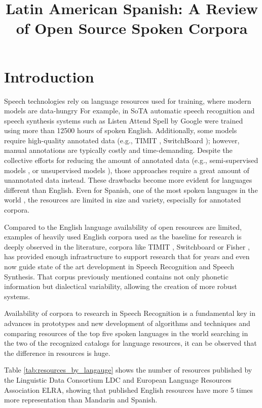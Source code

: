 \documentclass[10pt, a4paper]{article}
\title{Latin American Spanish: A Review of Open Source Spoken Corpora}
\begin{document}
\maketitleabstract


\section{Introduction}

Speech technologies rely on language resources used for training, where modern models are data-hungry For example, in SoTA automatic speech recognition and speech synthesis systems such as Listen Attend Spell by Google \cite{Chiu2018} were trained using more than 12500 hours of spoken English. Additionally, some models require high-quality annotated data (e.g., TIMIT \cite{TIMIT}, SwitchBoard \cite{Switchboard}); however, manual annotations are typically costly and time-demanding. Despite the collective efforts for reducing the amount of annotated data (e.g., semi-supervised models \cite{AmazonSemiSupervised}, or unsupervised models \cite{ZeroResources}), those approaches require a great amount of unannotated data instead. These drawbacks become more evident for languages different than English. Even for Spanish, one of the most spoken languages in the world \cite{HernndezMena2017}, the resources are limited in size and variety, especially for annotated corpora.

Compared to the English language availability of open resources are limited, examples of heavily used English corpora used as the baseline for research is deeply observed in the literature, corpora like TIMIT \cite{TIMIT}, Switchboard \cite{Switchboard} or Fisher \cite{Fisher}, has provided enough infrastructure to support research that for years and even now guide state of the art development in Speech Recognition and Speech Synthesis. That corpus previously mentioned contains not only phonetic information but dialectical variability, allowing the creation of more robust systems.

Availability of corpora to research in Speech Recognition is a fundamental key in advances in prototypes and new development of algorithms and techniques and comparing resources of the top five spoken languages in the world searching in the two of the recognized catalogs for language resources, it can be observed that the difference in resources is huge. 

Table \ref{tab:resources_by_langauge} shows the number of resources published by the Linguistic Data Consortium LDC and European Language Resources Association ELRA, showing that published English resources have more 5 times more representation than Mandarin and Spanish.
\end{document}
